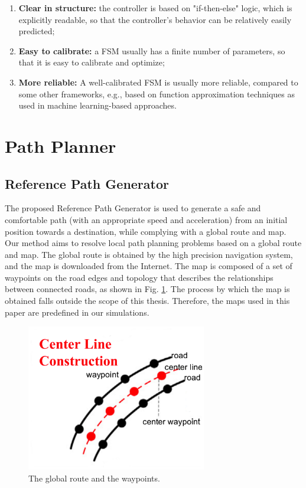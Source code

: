 \begin{enumerate}
\item \textbf {Clear in structure:} the controller is based on "if-then-else" logic, which is explicitly readable, so that the controller's behavior can be relatively easily predicted; 
\item \textbf {Easy to calibrate:} a FSM usually has a finite number of parameters, so that it is easy to calibrate and optimize;
\item \textbf {More reliable:} A well-calibrated FSM is usually more reliable, compared to some other frameworks, e.g., based on function approximation techniques as used in machine learning-based approaches.  
\end{enumerate}

\section{Path Planner}

\subsection{Reference Path Generator}

The proposed Reference Path Generator is used to generate a safe and comfortable path (with an appropriate speed and acceleration) from an initial position towards a destination, while complying with a global route and map. Our method aims to resolve local path planning problems based on a global route and map. The global route is obtained by the high precision navigation system, and the map is downloaded from the Internet. The map is composed of a set of waypoints on the road edges and topology that describes the relationships between connected roads, as shown in Fig. \ref{fig:center-line}. The process by which the map is obtained falls outside the scope of this thesis. Therefore, the maps used in this paper are predefined in our simulations.

\begin{figure}[h]
\centering
\includegraphics[width=0.7\textwidth]{figs/ch3/center-line}
\caption{The global route and the waypoints.}
\label{fig:center-line}
\end{figure}

